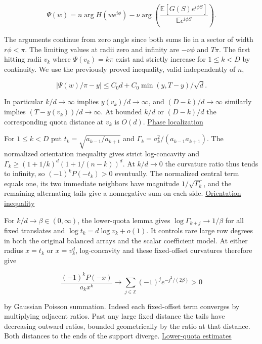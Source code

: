 \begin{equation*}
\Psi(w)=n\arg H(we^{i\phi})
-\nu\arg\left(\frac{\mathbb E[G(S)e^{i\phi S}]}{\mathbb E e^{i\phi S}}\right).
\end{equation*}

The arguments continue from zero angle since both sums lie in a sector of width $r\phi<\pi$. The limiting values at radii zero and infinity are $-\nu\phi$ and $T\pi$. The first hitting radii $v_k$ where $\Psi(v_k)=k\pi$ exist and strictly increase for $1\le k<D$ by continuity. We use the previously proved inequality, valid independently of $n$,

\begin{equation*}
|\Psi(w)/\pi-y|\le C_0 d+C_0\min(y,T-y)/\sqrt d.
\end{equation*}

In particular $k/d\to\infty$ implies $y(v_k)/d\to\infty$, and $(D-k)/d\to\infty$ similarly implies $(T-y(v_k))/d\to\infty$. At bounded $k/d$ or $(D-k)/d$ the corresponding quota distance at $v_k$ is $O(d)$. \href{https://github.com/ProgramComputer/open-math-research/blob/4fb624ba937a8eecc1361a6066185cd81ab7b172/topics/balanced-arrays/quadratic/proof.md}{Phase localization}

For $1\le k<D$ put $t_k=\sqrt{a_{k-1}/a_{k+1}}$ and $\Gamma_k=a_k^2/(a_{k-1}a_{k+1})$. The normalized orientation inequality gives strict log-concavity and $\Gamma_k\ge(1+1/k)^d(1+1/(n-k))^d$. At $k/d\to0$ the curvature ratio thus tends to infinity, so $(-1)^kP(-t_k)>0$ eventually. The normalized central term equals one, its two immediate neighbors have magnitude $1/\sqrt{\Gamma_k}$, and the remaining alternating tails give a nonnegative sum on each side. \href{https://github.com/ProgramComputer/open-math-research/blob/4fb624ba937a8eecc1361a6066185cd81ab7b172/topics/balanced-arrays/orientation-normalization.md}{Orientation inequality}

For $k/d\to\beta\in(0,\infty)$, the lower-quota lemma gives $\log\Gamma_{k+j}\to1/\beta$ for all fixed translates and $\log t_k=d\log v_k+o(1)$. It controls rare large row degrees in both the original balanced arrays and the scalar coefficient model. At either radius $x=t_k$ or $x=v_k^d$, log-concavity and these fixed-offset curvatures therefore give

\begin{equation*}
\frac{(-1)^kP(-x)}{a_k x^k}
\longrightarrow\sum_{j\in\mathbb Z}(-1)^j e^{-j^2/(2\beta)}>0
\end{equation*}

by Gaussian Poisson summation. Indeed each fixed-offset term converges by multiplying adjacent ratios. Past any large fixed distance the tails have decreasing outward ratios, bounded geometrically by the ratio at that distance. Both distances to the ends of the support diverge. \hyperref[sec:fifth-thirds-lower-quota]{Lower-quota estimates}

